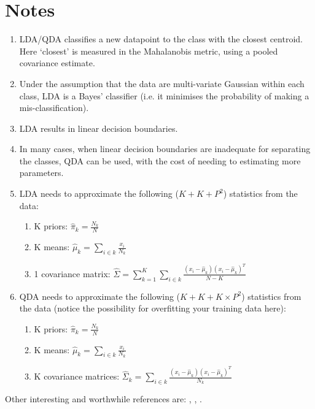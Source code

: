 \documentclass{article}
\begin{document}
\section{Notes}
\begin{enumerate}
  \item LDA/QDA classifies a new datapoint to the class with the closest centroid. Here `closest' is measured in the Mahalanobis metric, using a pooled covariance estimate.
  \item Under the assumption that the data are multi-variate Gaussian within each class, LDA is a Bayes' classifier (i.e. it minimises the probability of making a mis-classification).
  \item LDA results in linear decision boundaries.
  \item In many cases, when linear decision boundaries are inadequate for separating the classes, QDA can be used, with the cost of needing to estimating more parameters.
  \item LDA needs to approximate the following ($K + K + P^2$) statistics from the data:
  \begin{enumerate}
    \item K priors: $\hat\pi_k = \frac{N_k}{N}$
    \item K means: $\hat\mu_k = \sum_{i \in k} \frac{x_i}{N_k}$
    \item 1 covariance matrix: $\hat\Sigma = \sum_{k=1}^K\sum_{i \in k} \frac{(x_i - \hat\mu_k)(x_i - \hat\mu_k)^T}{N-K}$
  \end{enumerate}
  \item QDA needs to approximate the following ($K + K + K \times P^2$) statistics from the data (notice the possibility for overfitting your training data here):
  \begin{enumerate}
    \item K priors: $\hat\pi_k = \frac{N_k}{N}$
    \item K means: $\hat\mu_k = \sum_{i \in k} \frac{x_i}{N_k}$
    \item K covariance matrices: $\hat\Sigma_k = \sum_{i \in k} \frac{(x_i - \hat\mu_k)(x_i - \hat\mu_k)^T}{N_k}$
  \end{enumerate}
\end{enumerate}

Other interesting and worthwhile references are: \cite{turk1991face}, \cite{belhumeur1997eigenfaces}, \cite{martinez2001pca}.



\end{document}
